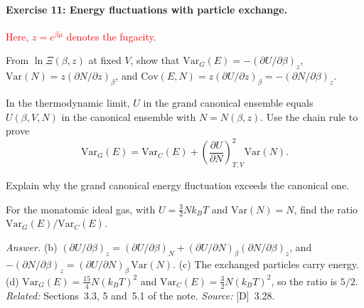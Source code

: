 \documentclass[11pt]{article}      %
\numberwithin{equation}{section}   %
\begin{document}
\paragraph{Exercise 11: Energy fluctuations with particle exchange.}
\textcolor{red}{Here, $z = e^{\beta\mu}$ denotes the fugacity.}
\begin{parts}
    \item From $\ln\Xi(\beta, z)$ at fixed $V$, show that $\mathrm{Var}_G(E) = -(\partial U/\partial\beta)_z$, $\mathrm{Var}(N) = z(\partial N/\partial z)_\beta$, and $\mathrm{Cov}(E, N) = z(\partial U/\partial z)_\beta = -(\partial N/\partial\beta)_z$.
    \item In the thermodynamic limit, $U$ in the grand canonical ensemble equals $U(\beta, V, N)$ in the canonical ensemble with $N = N(\beta, z)$. Use the chain rule to prove
    \begin{equation*}
        \mathrm{Var}_G(E) = \mathrm{Var}_C(E) + \left(\frac{\partial U}{\partial N}\right)_{T,V}^2\mathrm{Var}(N).
    \end{equation*}
    \item Explain why the grand canonical energy fluctuation exceeds the canonical one.
    \item For the monatomic ideal gas, with $U = \tfrac32Nk_BT$ and $\mathrm{Var}(N) = N$, find the ratio $\mathrm{Var}_G(E)/\mathrm{Var}_C(E)$.
\end{parts}
\textit{Answer.} (b) $(\partial U/\partial\beta)_z = (\partial U/\partial\beta)_N + (\partial U/\partial N)_\beta(\partial N/\partial\beta)_z$, and $-(\partial N/\partial\beta)_z = (\partial U/\partial N)_\beta\,\mathrm{Var}(N)$. (c) The exchanged particles carry energy. (d) $\mathrm{Var}_G(E) = \tfrac{15}{4}N(k_BT)^2$ and $\mathrm{Var}_C(E) = \tfrac32N(k_BT)^2$, so the ratio is $5/2$.\\
\textit{Related:} Sections~3.3, 5 and~5.1 of the note. \textit{Source:} [D]~3.28.
\end{document}
